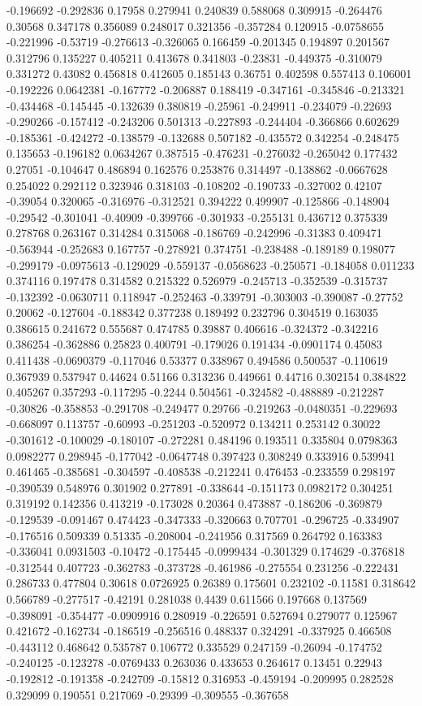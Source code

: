 -0.196692 -0.292836 0.17958 0.279941 0.240839 0.588068 0.309915 -0.264476 0.30568 0.347178 0.356089 0.248017 0.321356 -0.357284 0.120915 -0.0758655 -0.221996 -0.53719 -0.276613 -0.326065 0.166459 -0.201345 0.194897 0.201567 0.312796 0.135227 0.405211 0.413678 0.341803 -0.23831 -0.449375 -0.310079 0.331272 0.43082 0.456818 0.412605 0.185143 0.36751 0.402598 0.557413 0.106001 -0.192226 0.0642381 -0.167772 -0.206887 0.188419 -0.347161 -0.345846 -0.213321 -0.434468 -0.145445 -0.132639 0.380819 -0.25961 -0.249911 -0.234079 -0.22693 -0.290266 -0.157412 -0.243206 0.501313 -0.227893 -0.244404 -0.366866 0.602629 -0.185361 -0.424272 -0.138579 -0.132688 0.507182 -0.435572 0.342254 -0.248475 0.135653 -0.196182 0.0634267 0.387515 -0.476231 -0.276032 -0.265042 0.177432 0.27051 -0.104647 0.486894 0.162576 0.253876 0.314497 -0.138862 -0.0667628 0.254022 0.292112 0.323946 0.318103 -0.108202 -0.190733 -0.327002 0.42107 -0.39054 0.320065 -0.316976 -0.312521 0.394222 0.499907 -0.125866 -0.148904 -0.29542 -0.301041 -0.40909 -0.399766 -0.301933 -0.255131 0.436712 0.375339 0.278768 0.263167 0.314284 0.315068 -0.186769 -0.242996 -0.31383 0.409471 -0.563944 -0.252683 0.167757 -0.278921 0.374751 -0.238488 -0.189189 0.198077 -0.299179 -0.0975613 -0.129029 -0.559137 -0.0568623 -0.250571 -0.184058 0.011233 0.374116 0.197478 0.314582 0.215322 0.526979 -0.245713 -0.352539 -0.315737 -0.132392 -0.0630711 0.118947 -0.252463 -0.339791 -0.303003 -0.390087 -0.27752 0.20062 -0.127604 -0.188342 0.377238 0.189492 0.232796 0.304519 0.163035 0.386615 0.241672 0.555687 0.474785 0.39887 0.406616 -0.324372 -0.342216 0.386254 -0.362886 0.25823 0.400791 -0.179026 0.191434 -0.0901174 0.45083 0.411438 -0.0690379 -0.117046 0.53377 0.338967 0.494586 0.500537 -0.110619 0.367939 0.537947 0.44624 0.51166 0.313236 0.449661 0.44716 0.302154 0.384822 0.405267 0.357293 -0.117295 -0.2244 0.504561 -0.324582 -0.488889 -0.212287 -0.30826 -0.358853 -0.291708 -0.249477 0.29766 -0.219263 -0.0480351 -0.229693 -0.668097 0.113757 -0.60993 -0.251203 -0.520972 0.134211 0.253142 0.30022 -0.301612 -0.100029 -0.180107 -0.272281 0.484196 0.193511 0.335804 0.0798363 0.0982277 0.298945 -0.177042 -0.0647748 0.397423 0.308249 0.333916 0.539941 0.461465 -0.385681 -0.304597 -0.408538 -0.212241 0.476453 -0.233559 0.298197 -0.390539 0.548976 0.301902 0.277891 -0.338644 -0.151173 0.0982172 0.304251 0.319192 0.142356 0.413219 -0.173028 0.20364 0.473887 -0.186206 -0.369879 -0.129539 -0.091467 0.474423 -0.347333 -0.320663 0.707701 -0.296725 -0.334907 -0.176516 0.509339 0.51335 -0.208004 -0.241956 0.317569 0.264792 0.163383 -0.336041 0.0931503 -0.10472 -0.175445 -0.0999434 -0.301329 0.174629 -0.376818 -0.312544 0.407723 -0.362783 -0.373728 -0.461986 -0.275554 0.231256 -0.222431 0.286733 0.477804 0.30618 0.0726925 0.26389 0.175601 0.232102 -0.11581 0.318642 0.566789 -0.277517 -0.42191 0.281038 0.4439 0.611566 0.197668 0.137569 -0.398091 -0.354477 -0.0909916 0.280919 -0.226591 0.527694 0.279077 0.125967 0.421672 -0.162734 -0.186519 -0.256516 0.488337 0.324291 -0.337925 0.466508 -0.443112 0.468642 0.535787 0.106772 0.335529 0.247159 -0.26094 -0.174752 -0.240125 -0.123278 -0.0769433 0.263036 0.433653 0.264617 0.13451 0.22943 -0.192812 -0.191358 -0.242709 -0.15812 0.316953 -0.459194 -0.209995 0.282528 0.329099 0.190551 0.217069 -0.29399 -0.309555 -0.367658 